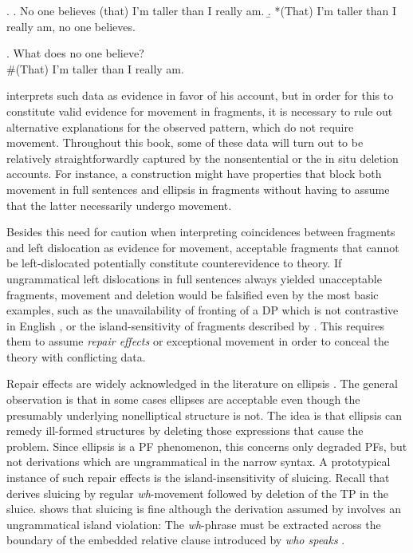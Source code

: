 \ex. \label{ex:merchant.teacher-sent}
\a. No one believes (that) I’m taller than I really am. 
\b. *(That) I’m taller than I really am, no one believes.

\ex. \label{ex:merchant.teacher-frag}
What does no one believe? \hfill \citep[690]{merchant2004}\\
\mbox{}\hspace{-.45em}\#(That) I’m taller than I really am.

\citet{merchant2004} interprets such data as evidence in favor of his account, but in order for this to constitute valid evidence for movement in fragments, it is necessary to rule out alternative explanations for the observed pattern, which do not require movement. Throughout this book, some of these data will turn out to be relatively straightforwardly captured by the nonsentential or the in situ deletion accounts. For instance, a construction might have properties that block both movement in full sentences and ellipsis in fragments without having to assume that the latter necessarily undergo movement.

Besides this need for caution when interpreting coincidences between fragments and left dislocation as evidence for movement, acceptable fragments that cannot be left-dislocated potentially constitute counterevidence to  theory. If ungrammatical left dislocations in full sentences always yielded unacceptable fragments, movement and deletion would be falsified even by the most basic examples, such as the unavailability of fronting of a DP which is not contrastive in English \citep{weir2014}, or the island-sensitivity of fragments described by \citet{merchant2004}. This requires them to assume \textit{repair effects} \citep{merchant2004} or exceptional movement \citep{weir2014} in order to conceal the theory with conflicting data.

Repair effects are widely acknowledged in the literature on ellipsis \citep[see e.g.][]{fox.lasnik2003, merchant2008, muller2011, lasnik2015}. The general observation is that in some cases ellipses are acceptable even though the presumably underlying nonelliptical structure is not. The idea is that ellipsis can remedy ill-formed structures by deleting those expressions that cause the problem. Since ellipsis is a PF phenomenon, this concerns only degraded PFs, but not derivations which are ungrammatical in the narrow syntax. A prototypical instance of such repair effects is the island-insensitivity of sluicing. Recall that \citet{merchant2001} derives sluicing by regular \textit{wh}-movement followed by deletion of the TP in the sluice. \Next[a] shows that sluicing is fine although the derivation assumed by \citeauthor{merchant2004} involves an ungrammatical island violation: The \textit{wh}-phrase must be extracted across the boundary of the embedded relative clause introduced by \textit{who speaks} \Next[b].

